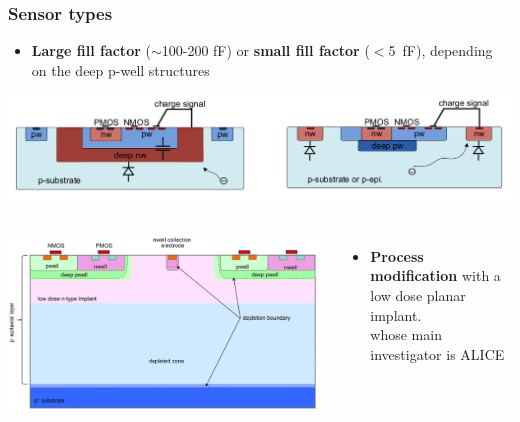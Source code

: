     
    \begin{frame}
        \frametitle{Sensor types}
            \begin{itemize}
                \item \textbf{Large fill factor} ($\sim$100-200 \si{fF}) or \textbf{small fill factor} ($<$\SI{5}{fF}), depending on the deep p-well structures
            \end{itemize}
            \includegraphics[width=1.05\linewidth]{figures/Pixel_detectors/large_small_sensor_scheme.png}\\
            \begin{columns}
                    \includegraphics[width=1.1\linewidth]{figures/Pixel_detectors/ALPIDE_after_PM.png}
                    \begin{itemize}
                        \item \textbf{Process modification} with a low dose planar implant. \\
                        whose main investigator is ALICE\\
                    \end{itemize} 
            \end{columns}

            \end{frame} 
